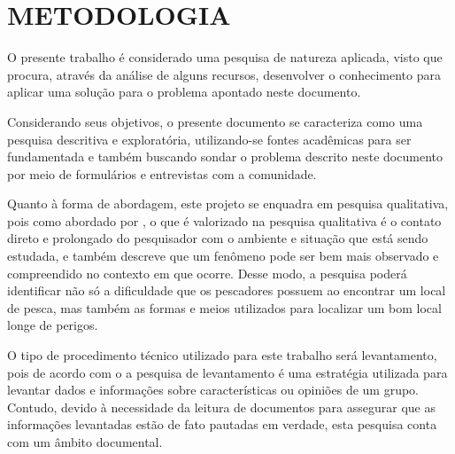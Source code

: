 
\chapter{METODOLOGIA}
\label{chap:metodologia}

O presente trabalho é considerado uma pesquisa de natureza aplicada, visto que procura, através da análise de alguns recursos, desenvolver o conhecimento para aplicar uma solução para o problema apontado neste documento.

Considerando seus objetivos, o presente documento se caracteriza como uma pesquisa descritiva e exploratória, utilizando-se fontes acadêmicas para ser fundamentada e também buscando sondar o problema descrito neste documento por meio de formulários e entrevistas com a comunidade.

Quanto à forma de abordagem, este projeto se enquadra em pesquisa qualitativa, pois como abordado por , o que é valorizado na pesquisa qualitativa é o contato direto e prolongado do pesquisador com o ambiente e situação que está sendo estudada, e também descreve que um fenômeno pode ser bem mais observado e compreendido no contexto em que ocorre. Desse modo, a pesquisa poderá identificar não só a dificuldade que os pescadores possuem ao encontrar um local de pesca, mas também as formas e meios utilizados para localizar um bom local longe de perigos.

O tipo de procedimento técnico utilizado para este trabalho será levantamento, pois de acordo com o  a pesquisa de levantamento é uma estratégia utilizada para levantar dados e informações sobre características ou opiniões de um grupo. Contudo, devido à necessidade da leitura de documentos para assegurar que as informações levantadas estão de fato pautadas em verdade, esta pesquisa conta com um âmbito documental.



